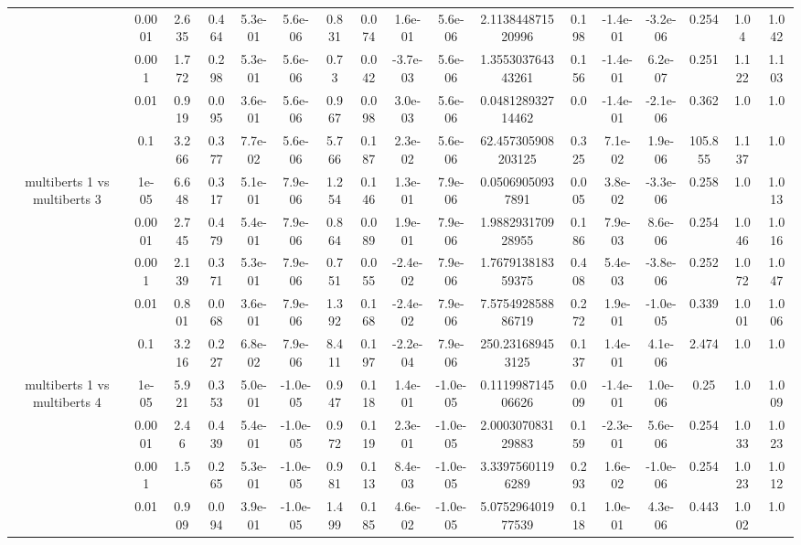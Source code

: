 \begin{tabular}{|c|c|c|c|c|c|c|c|c|c|c|c|c|c|c|c|c|}
 & 0.0001 & 2.635 & 0.464 & 5.3e-01 & 5.6e-06 & 0.831 & 0.074 & 1.6e-01 & 5.6e-06 & 2.113844871520996 & 0.198 & -1.4e-01 & -3.2e-06 & 0.254 & 1.04 & 1.042 \\
 & 0.001 & 1.772 & 0.298 & 5.3e-01 & 5.6e-06 & 0.73 & 0.042 & -3.7e-03 & 5.6e-06 & 1.355303764343261 & 0.156 & -1.4e-01 & 6.2e-07 & 0.251 & 1.122 & 1.103 \\
 & 0.01 & 0.919 & 0.095 & 3.6e-01 & 5.6e-06 & 0.967 & 0.098 & 3.0e-03 & 5.6e-06 & 0.048128932714462 & 0.0 & -1.4e-01 & -2.1e-06 & 0.362 & 1.0 & 1.0 \\
 & 0.1 & 3.266 & 0.377 & 7.7e-02 & 5.6e-06 & 5.766 & 0.187 & 2.3e-02 & 5.6e-06 & 62.457305908203125 & 0.325 & 7.1e-02 & 1.9e-06 & 105.855 & 1.137 & 1.0 \\
\hline
\multirow{5}{*}{multiberts 1 vs multiberts 3} & 1e-05 & 6.648 & 0.317 & 5.1e-01 & 7.9e-06 & 1.254 & 0.146 & 1.3e-01 & 7.9e-06 & 0.05069050937891 & 0.005 & 3.8e-02 & -3.3e-06 & 0.258 & 1.0 & 1.013 \\
 & 0.0001 & 2.745 & 0.479 & 5.4e-01 & 7.9e-06 & 0.864 & 0.089 & 1.9e-01 & 7.9e-06 & 1.988293170928955 & 0.186 & 7.9e-03 & 8.6e-06 & 0.254 & 1.046 & 1.016 \\
 & 0.001 & 2.139 & 0.371 & 5.3e-01 & 7.9e-06 & 0.751 & 0.055 & -2.4e-02 & 7.9e-06 & 1.767913818359375 & 0.408 & 5.4e-03 & -3.8e-06 & 0.252 & 1.072 & 1.047 \\
 & 0.01 & 0.801 & 0.068 & 3.6e-01 & 7.9e-06 & 1.392 & 0.168 & -2.4e-02 & 7.9e-06 & 7.575492858886719 & 0.272 & 1.9e-01 & -1.0e-05 & 0.339 & 1.001 & 1.006 \\
 & 0.1 & 3.216 & 0.227 & 6.8e-02 & 7.9e-06 & 8.411 & 0.197 & -2.2e-04 & 7.9e-06 & 250.231689453125 & 0.137 & 1.4e-01 & 4.1e-06 & 2.474 & 1.0 & 1.0 \\
\hline
\multirow{5}{*}{multiberts 1 vs multiberts 4} & 1e-05 & 5.921 & 0.353 & 5.0e-01 & -1.0e-05 & 0.947 & 0.118 & 1.4e-01 & -1.0e-05 & 0.111998714506626 & 0.009 & -1.4e-01 & 1.0e-06 & 0.25 & 1.0 & 1.009 \\
 & 0.0001 & 2.46 & 0.439 & 5.4e-01 & -1.0e-05 & 0.972 & 0.119 & 2.3e-01 & -1.0e-05 & 2.000307083129883 & 0.159 & -2.3e-01 & 5.6e-06 & 0.254 & 1.033 & 1.023 \\
 & 0.001 & 1.5 & 0.265 & 5.3e-01 & -1.0e-05 & 0.981 & 0.113 & 8.4e-03 & -1.0e-05 & 3.33975601196289 & 0.293 & 1.6e-02 & -1.0e-06 & 0.254 & 1.023 & 1.012 \\
 & 0.01 & 0.909 & 0.094 & 3.9e-01 & -1.0e-05 & 1.499 & 0.185 & 4.6e-02 & -1.0e-05 & 5.075296401977539 & 0.118 & 1.0e-01 & 4.3e-06 & 0.443 & 1.002 & 1.0 \\

\end{tabular}
